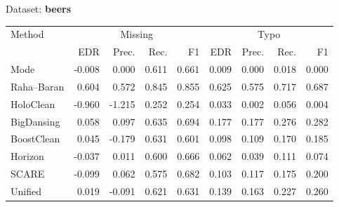 \begin{subtable}[t]{0.492\linewidth}
\caption{Dataset: \textbf{beers}}
\label{tab:q1-acc-beers}
\centering
\begin{tabular}{lrrrrrrrr}
\toprule
\multirow{2}{*}{Method} &\multicolumn{4}{c}{Missing} &\multicolumn{4}{c}{Typo}\\
\cmidrule(lr){2-5}\cmidrule(l){6-9}
 & EDR & Prec. & Rec. & F1 & EDR & Prec. & Rec. & F1\\
\midrule
\midrule
Mode & -0.008 & 0.000 & 0.611 & 0.661 & 0.009 & 0.000 & 0.018 & 0.000 \\
Raha–Baran & 0.604 & 0.572 & 0.845 & 0.855 & 0.625 & 0.575 & 0.717 & 0.687 \\
HoloClean & -0.960 & -1.215 & 0.252 & 0.254 & 0.033 & 0.002 & 0.056 & 0.004 \\
BigDansing & 0.058 & 0.097 & 0.635 & 0.694 & 0.177 & 0.177 & 0.276 & 0.282 \\
BoostClean & 0.045 & -0.179 & 0.631 & 0.601 & 0.098 & 0.109 & 0.170 & 0.185 \\
Horizon & -0.037 & 0.011 & 0.600 & 0.666 & 0.062 & 0.039 & 0.111 & 0.074 \\
SCARE & -0.099 & 0.062 & 0.575 & 0.682 & 0.103 & 0.117 & 0.175 & 0.200 \\
Unified & 0.019 & -0.091 & 0.621 & 0.631 & 0.139 & 0.163 & 0.227 & 0.260 \\
\bottomrule
\bottomrule
\end{tabular}
\end{subtable}